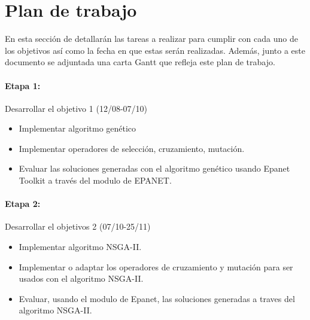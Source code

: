 \documentclass[11pt,letterpaper]{article}
\begin{document}
\section{Plan de trabajo}


En esta sección de detallarán las tareas a realizar para cumplir con cada uno de los objetivos así como la fecha en que estas serán realizadas. Además, junto a este documento se adjuntada una carta Gantt que refleja este plan de trabajo.

\paragraph{Etapa 1:} Desarrollar el objetivo 1 (12/08-07/10)
\begin{itemize}
	\item Implementar algoritmo genético
	\item Implementar operadores de selección, cruzamiento, mutación.
	\item Evaluar las soluciones generadas con el algoritmo genético usando Epanet Toolkit a través del modulo de EPANET.
\end{itemize}

\paragraph{Etapa 2:} Desarrollar el objetivos 2 (07/10-25/11)
\begin{itemize}
	\item Implementar algoritmo NSGA-II.
	\item Implementar o adaptar los operadores de cruzamiento y mutación para ser usados con el algoritmo NSGA-II.
	\item Evaluar, usando el modulo de Epanet, las soluciones generadas a traves del algoritmo NSGA-II.
\end{itemize}
\end{document}
